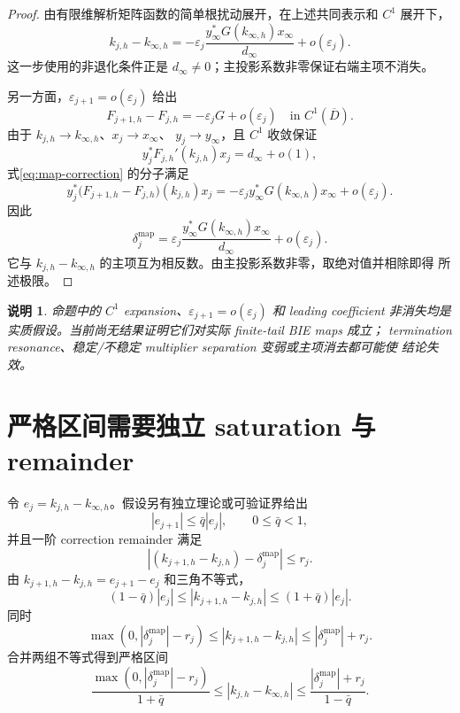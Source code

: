 \documentclass[UTF8,fontset=fandol,11pt,a4paper]{ctexart}
\newtheorem{remark}{说明}
\begin{document}
\begin{proof}
由有限维解析矩阵函数的简单根扰动展开，在上述共同表示和 $C^1$ 展开下，
\[
  k_{j,h}-k_{\infty,h}
  =-\varepsilon_j
  \frac{y_\infty^*G(k_{\infty,h})x_\infty}{d_\infty}
  +o(\varepsilon_j).
\]
这一步使用的非退化条件正是 $d_\infty\ne0$；主投影系数非零保证右端主项不消失。

另一方面，$\varepsilon_{j+1}=o(\varepsilon_j)$ 给出
\[
  F_{j+1,h}-F_{j,h}
  =-\varepsilon_jG+o(\varepsilon_j)
  \quad\text{in }C^1(\overline D).
\]
由于 $k_{j,h}\to k_{\infty,h}$、$x_j\to x_\infty$、
$y_j\to y_\infty$，且 $C^1$ 收敛保证
\[
  y_j^*F_{j,h}'(k_{j,h})x_j=d_\infty+o(1),
\]
式\eqref{eq:map-correction} 的分子满足
\[
  y_j^*\bigl(F_{j+1,h}-F_{j,h}\bigr)(k_{j,h})x_j
  =-\varepsilon_j
   y_\infty^*G(k_{\infty,h})x_\infty
   +o(\varepsilon_j).
\]
因此
\[
  \delta_j^{\mathrm{map}}
  =\varepsilon_j
  \frac{y_\infty^*G(k_{\infty,h})x_\infty}{d_\infty}
  +o(\varepsilon_j).
\]
它与 $k_{j,h}-k_{\infty,h}$ 的主项互为相反数。由主投影系数非零，取绝对值并相除即得
所述极限。
\end{proof}

\begin{remark}
命题中的 $C^1$ expansion、$\varepsilon_{j+1}=o(\varepsilon_j)$ 和 leading coefficient
非消失均是实质假设。当前尚无结果证明它们对实际 finite-tail BIE maps 成立；
termination resonance、稳定/不稳定 multiplier separation 变弱或主项消去都可能使
结论失效。
\end{remark}

\section{严格区间需要独立 saturation 与 remainder}

令 $e_j=k_{j,h}-k_{\infty,h}$。假设另有独立理论或可验证界给出
\[
  |e_{j+1}|\le\bar q|e_j|,
  \qquad 0\le\bar q<1,
\]
并且一阶 correction remainder 满足
\[
  |(k_{j+1,h}-k_{j,h})-\delta_j^{\mathrm{map}}|\le r_j.
\]
由 $k_{j+1,h}-k_{j,h}=e_{j+1}-e_j$ 和三角不等式，
\[
  (1-\bar q)|e_j|
  \le |k_{j+1,h}-k_{j,h}|
  \le (1+\bar q)|e_j|.
\]
同时
\[
  \max(0,|\delta_j^{\mathrm{map}}|-r_j)
  \le |k_{j+1,h}-k_{j,h}|
  \le |\delta_j^{\mathrm{map}}|+r_j.
\]
合并两组不等式得到严格区间
\begin{equation}
  \boxed{
  \frac{\max(0,|\delta_j^{\mathrm{map}}|-r_j)}{1+\bar q}
  \le |k_{j,h}-k_{\infty,h}|
  \le
  \frac{|\delta_j^{\mathrm{map}}|+r_j}{1-\bar q}}
  .
  \label{eq:reliable-interval}
\end{equation}
\end{document}

